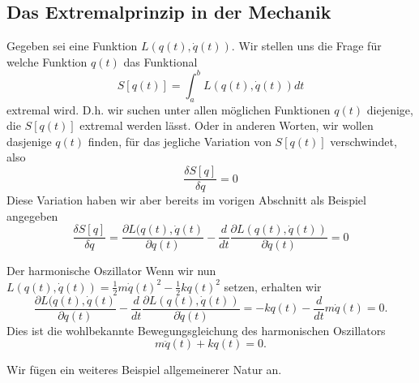 \subsection{Das Extremalprinzip in der Mechanik}
Gegeben sei eine Funktion $L(q(t),\dot q(t))$. Wir stellen uns die Frage für
welche Funktion $q(t)$ das Funktional
\[
  S[q(t)]=\int_a^b L(q(t),\dot q(t)) dt
\]
extremal wird. D.h. wir suchen unter allen möglichen Funktionen $q(t)$
diejenige, die $S[q(t)]$ extremal werden lässt. Oder in anderen Worten, wir
wollen dasjenige $q(t)$ finden, für das jegliche Variation von $S[q(t)]$
verschwindet, also 
\[\frac{\delta S[q]}{\delta q}=0\]
Diese Variation haben wir aber bereits im vorigen Abschnitt als Beispiel angegeben
\[
  \frac{\delta S[q]}{\delta q}=\frac{\partial L(q(t),\dot q(t)}{\partial q(t)}
    -\frac{d}{dt} \frac{\partial L(q(t),\dot q(t))}{\partial \dot q(t)}=0
\]
\begin{example}{Der harmonische Oszillator}
Wenn wir nun $L(q(t),\dot q(t))=\frac{1}{2}m\dot
q(t)^2-\frac{1}{2}k q(t)^2$ setzen, erhalten wir
\[ \frac{\partial L(q(t),\dot q(t)}{\partial q(t)}
    -\frac{d}{dt} \frac{\partial L(q(t),\dot q(t))}{\partial \dot q(t)}=
   -kq(t)-\frac{d}{dt}m\dot q(t)
   =0.
 \]
 Dies ist die wohlbekannte Bewegungsgleichung des harmonischen Oszillators\newline 
 \[m\ddot q(t)+kq(t)=0.\]
\end{example}
Wir fügen ein weiteres Beispiel allgemeinerer Natur an.
